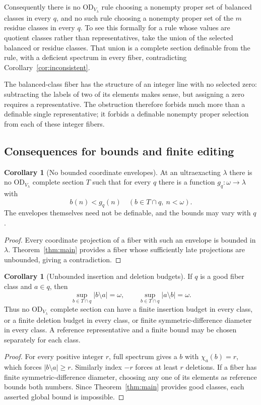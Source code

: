 \documentclass[11pt,letterpaper]{article}
\theoremstyle{definition}
\newtheorem{corollary}[definition]{Corollary}
\newcommand{\OD}{\mathrm{OD}}
\numberwithin{equation}{section}
\newcommand{\ch}{\chi}
\begin{document}
Consequently there is no $\OD_{V_\lambda}$ rule choosing a nonempty proper set of balanced classes in every $q$, and no such rule choosing a nonempty proper set of the $m$ residue classes in every $q$. To see this formally for a rule whose values are quotient classes rather than representatives, take the union of the selected balanced or residue classes. That union is a complete section definable from the rule, with a deficient spectrum in every fiber, contradicting Corollary~\ref{cor:inconsistent}.

The balanced-class fiber has the structure of an integer line with no selected zero: subtracting the labels of two of its elements makes sense, but assigning a zero requires a representative. The obstruction therefore forbids much more than a definable single representative; it forbids a definable nonempty proper selection from each of these integer fibers.

\subsection{Consequences for bounds and finite editing}

\begin{corollary}[No bounded coordinate envelopes]\label{cor:envelopes}
At an ultraexacting $\lambda$ there is no $\OD_{V_\lambda}$ complete section $T$ such that for every $q$ there is a function $g_q:\omega\to\lambda$ with
\[
b(n)<g_q(n)\quad(b\in T\cap q,\ n<\omega).
\]
The envelopes themselves need not be definable, and the bounds may vary with $q$.
\end{corollary}
\begin{proof}
Every coordinate projection of a fiber with such an envelope is bounded in $\lambda$. Theorem~\ref{thm:main} provides a fiber whose sufficiently late projections are unbounded, giving a contradiction.
\end{proof}

\begin{corollary}[Unbounded insertion and deletion budgets]\label{cor:edits}
If $q$ is a good fiber class and $a\in q$, then
\[
\sup_{b\in T\cap q}|b\setminus a|=\omega,
\qquad
\sup_{b\in T\cap q}|a\setminus b|=\omega.
\]
Thus no $\OD_{V_\lambda}$ complete section can have a finite insertion budget in every class, or a finite deletion budget in every class, or finite symmetric-difference diameter in every class. A reference representative and a finite bound may be chosen separately for each class.
\end{corollary}
\begin{proof}
For every positive integer $r$, full spectrum gives a $b$ with $\ch_a(b)=r$, which forces $|b\setminus a|\ge r$. Similarly index $-r$ forces at least $r$ deletions. If a fiber has finite symmetric-difference diameter, choosing any one of its elements as reference bounds both numbers. Since Theorem~\ref{thm:main} provides good classes, each asserted global bound is impossible.
\end{proof}
\end{document}
